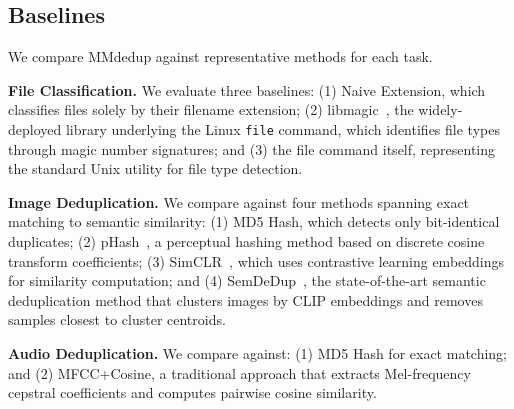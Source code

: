 \documentclass[sigconf, nonacm]{acmart}
\begin{document}

\subsection{Baselines}

We compare MMdedup against representative methods for each task.

\textbf{File Classification.} We evaluate three baselines: (1) Naive Extension, which classifies files solely by their filename extension; (2) libmagic~\cite{darwin2008libmagic}, the widely-deployed library underlying the Linux \texttt{file} command, which identifies file types through magic number signatures; and (3) the file command itself, representing the standard Unix utility for file type detection.

\textbf{Image Deduplication.} We compare against four methods spanning exact matching to semantic similarity: (1) MD5 Hash, which detects only bit-identical duplicates; (2) pHash~\cite{zauner2010implementation}, a perceptual hashing method based on discrete cosine transform coefficients; (3) SimCLR~\cite{chen2020simple}, which uses contrastive learning embeddings for similarity computation; and (4) SemDeDup~\cite{abbas2023semdedup}, the state-of-the-art semantic deduplication method that clusters images by CLIP embeddings and removes samples closest to cluster centroids.

\textbf{Audio Deduplication.} We compare against: (1) MD5 Hash for exact matching; and (2) MFCC+Cosine, a traditional approach that extracts Mel-frequency cepstral coefficients and computes pairwise cosine similarity.
\end{document}
